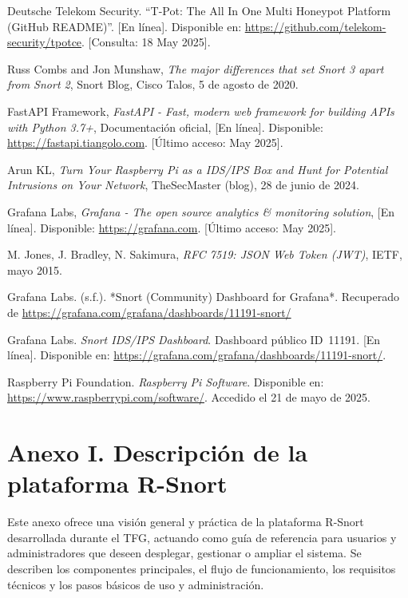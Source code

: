 \documentclass[11pt,a4paper,twoside]{report}
\begin{document}
\begin{thebibliography}{99}
	 Deutsche Telekom Security. ``T-Pot: The All In One Multi Honeypot Platform (GitHub README)''. [En línea]. Disponible en: \url{https://github.com/telekom-security/tpotce}. [Consulta: 18 May 2025].
	
	 Russ Combs and Jon Munshaw, \emph{The major differences that set Snort 3 apart from Snort 2}, Snort Blog, Cisco Talos, 5 de agosto de 2020.
	
	 FastAPI Framework, \emph{FastAPI - Fast, modern web framework for building APIs with Python 3.7+}, Documentación oficial, [En línea]. Disponible: \url{https://fastapi.tiangolo.com}. [Último acceso: May 2025].
	
	 Arun KL, \emph{Turn Your Raspberry Pi as a IDS/IPS Box and Hunt for Potential Intrusions on Your Network}, TheSecMaster (blog), 28 de junio de 2024.
	
	 Grafana Labs, \emph{Grafana - The open source analytics \& monitoring solution}, [En línea]. Disponible: \url{https://grafana.com}. [Último acceso: May 2025].
	
	 M. Jones, J. Bradley, N. Sakimura, \emph{RFC 7519: JSON Web Token (JWT)}, IETF, mayo 2015.
	
	Grafana Labs. (s.f.). *Snort (Community) Dashboard for Grafana*. Recuperado de \url{https://grafana.com/grafana/dashboards/11191-snort/}
	
	 Grafana Labs. \emph{Snort IDS/IPS Dashboard}. Dashboard público ID~11191. [En línea]. Disponible en: \url{https://grafana.com/grafana/dashboards/11191-snort/}.
	
	Raspberry Pi Foundation. \textit{Raspberry Pi Software}. Disponible en: \url{https://www.raspberrypi.com/software/}. Accedido el 21 de mayo de 2025.
	
\end{thebibliography}

\appendix
\chapter*{Anexo I. Descripción de la plataforma R-Snort}

Este anexo ofrece una visión general y práctica de la plataforma R-Snort desarrollada durante el TFG, actuando como guía de referencia para usuarios y administradores que deseen desplegar, gestionar o ampliar el sistema. Se describen los componentes principales, el flujo de funcionamiento, los requisitos técnicos y los pasos básicos de uso y administración.
\end{document}
